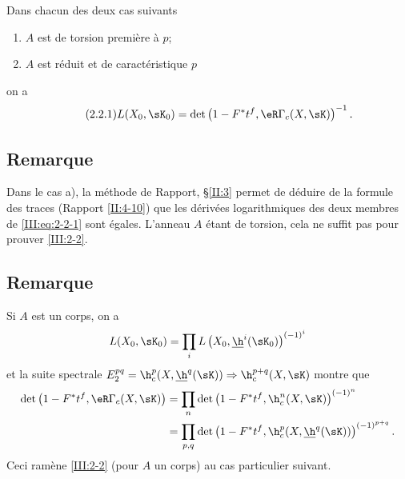 \begin{theorem_}\label{III:2-2}
Dans chacun des deux cas suivants
\begin{enumerate}[\indent a)]
  \item $A$ est de torsion première à $p$;
  \item $A$ est réduit et de caractéristique $p$
\end{enumerate}
on a 
\begin{equation*}\tag{2.2.1}\label{III:eq:2-2-1}
  L(X_0,\sK_0) = \det\left(1-F^* t^f, \eR\Gamma_c(X,\sK)\right)^{-1} \text{.}
\end{equation*}
\end{theorem_}





\subsection{Remarque}\label{III:2-3}

Dans le cas a), la méthode de Rapport, \S\ref{II:3} permet de déduire de 
la formule des traces (Rapport \ref{II:4-10}) que les dérivées logarithmiques 
des deux membres de \eqref{III:eq:2-2-1} sont égales. L'anneau $A$ étant de 
torsion, cela ne suffit pas pour prouver \ref{III:2-2}. 





\subsection{Remarque}\label{III:2-4}

Si $A$ est un corps, on a 
\[
  L(X_0,\sK_0) = \prod_i L\left(X_0,\underline\h^i(\sK_0)\right)^{(-1)^i}
\]
et la suite spectrale 
$E_2^{p q} = \h_c^p(X,\underline\h^q(\sK))\Rightarrow \h_c^{p+q}(X,\sK)$ montre 
que 
\begin{align*}
  \det\left(1-F^* t^f, \eR\Gamma_c(X,\sK)\right) 
    &= \prod_n \det\left(1-F^* t^f,\h_c^n(X,\sK)\right)^{(-1)^n} \\
    &= \prod_{p,q} \det\left(1-F^* t^f,\h_c^p(X,\underline\h^q(\sK))\right)^{(-1)^{p+q}} \text{.}
\end{align*}
Ceci ramène \ref{III:2-2} (pour $A$ un corps) au cas particulier suivant. 


\subsubsection{}\label{III:2-4-1}

